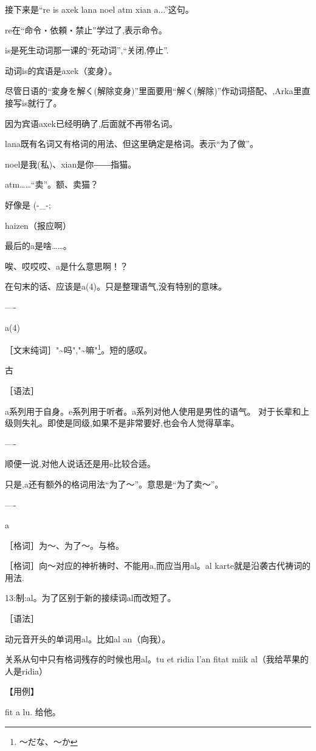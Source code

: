 接下来是``re is axek lana noel atm xian a...''这句。

re在``命令・依頼・禁止''学过了,表示命令。

is是死生动词那一课的``死动词'',``关闭,停止''.


动词is的宾语是axek（変身）。

尽管日语的``変身を解く(解除变身)''里面要用``解く(解除)''作动词搭配、,Arka里直接写is就行了。

因为宾语axek已经明确了,后面就不再带名词。

lana既有名词又有格词的用法、但这里确定是格词。表示``为了做''。

noel是我(私)、xian是你――指猫。

atm……``卖''。额、卖猫？


好像是  (-_-;

haizen（报应啊）


最后的a是啥……。

唉、哎哎哎、a是什么意思啊！？


在句末的话、应该是a(4)。只是整理语气,没有特别的意味。

----

a(4)

［文末纯词］"\~{}吗","\~{}嘛"\footnote{～だな、～か}。短的感叹。

古

［语法］

a系列用于自身。e系列用于听者。a系列对他人使用是男性的语气。
对于长辈和上级则失礼。即使是同级,如果不是非常要好,也会令人觉得草率。

----

顺便一说,对他人说话还是用e比较合适。

只是,a还有额外的格词用法``为了～''。意思是``为了卖～''。

----

a

［格词］为～、为了～。与格。

［格词］向～对应的神祈祷时、不能用a,而应当用al。al karte就是沿袭古代祷词的用法.

13:制:al。为了区别于新的接续词al而改短了。

［语法］

动元音开头的单词用al。比如al an（向我）。

关系从句中只有格词残存的时候也用al。tu et ridia l'an fitat miik al（我给苹果的人是ridia）

【用例】

fit a lu. 给他。

